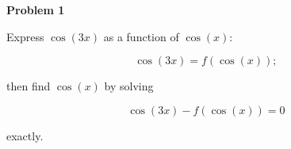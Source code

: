 \documentclass{article}
\begin{document}
{\bf Problem 1}

Express $\cos\left(3x\right)$ as a function of $\cos\left(x\right)$:

\begin{equation*}
  \cos\left(3x\right)=f\left(\cos\left(x\right)\right);
\end{equation*}

then find $\cos\left(x\right)$ by solving

\begin{equation*}
  \cos\left(3x\right)-f\left(\cos\left(x\right)\right)=0
\end{equation*}

exactly.
\end{document}
